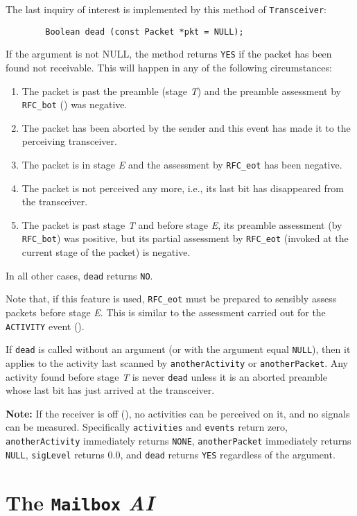 The last inquiry of interest is implemented by this method of
{\tt Transceiver}:
\begin{verbatim}
        Boolean dead (const Packet *pkt = NULL);
\end{verbatim}
\noindent
If the argument is not NULL, the method returns {\tt YES} if the packet has
been found not receivable.
This will happen in any of the following circumstances:
\begin{enumerate}
\item
The packet is past the preamble (stage {\em T\/}) and the preamble assessment
by {\tt RFC\_bot} () was negative.
\item
The packet has been aborted by the sender and this event has made it to
the perceiving transceiver.
\item
The packet is in stage {\em E\/} and the assessment by {\tt RFC\_eot} has
been negative.
\item
The packet is not perceived any more, i.e., its last bit has disappeared from
the transceiver.
\item
The packet is past stage {\em T\/} and before stage {\em E}, its preamble
assessment (by {\tt RFC\_bot}) was positive, but its partial assessment
by {\tt RFC\_eot} (invoked at the current stage of the packet) is negative.
\end{enumerate}
\noindent
In all other cases, {\tt dead} returns {\tt NO}.

Note that, if this feature is used, {\tt RFC\_eot} must be prepared to
sensibly assess packets before stage {\em E}.
This is similar to the assessment carried out for the {\tt ACTIVITY}
event ().

If {\tt dead} is called without an argument (or with the argument
equal {\tt NULL}), then it applies to the activity last scanned by
{\tt anotherActivity} or {\tt anotherPacket}.
Any activity found before stage {\em T\/} is never {\tt dead} unless it
is an aborted preamble whose last bit has just arrived at the
transceiver.

\noindent
{\bf Note:}
If the receiver is off (), no activities can be perceived
on it, and no signals can be measured.
Specifically {\tt activities} and {\tt events} return zero,
{\tt anotherActivity} immediately returns {\tt NONE},
{\tt anotherPacket} immediately returns {\tt NULL}, {\tt sigLevel} returns
$0.0$, and {\tt dead} returns {\tt YES} regardless of the argument.
\section{The {\tt Mailbox} {\em AI}}
\label{rm_mb}

